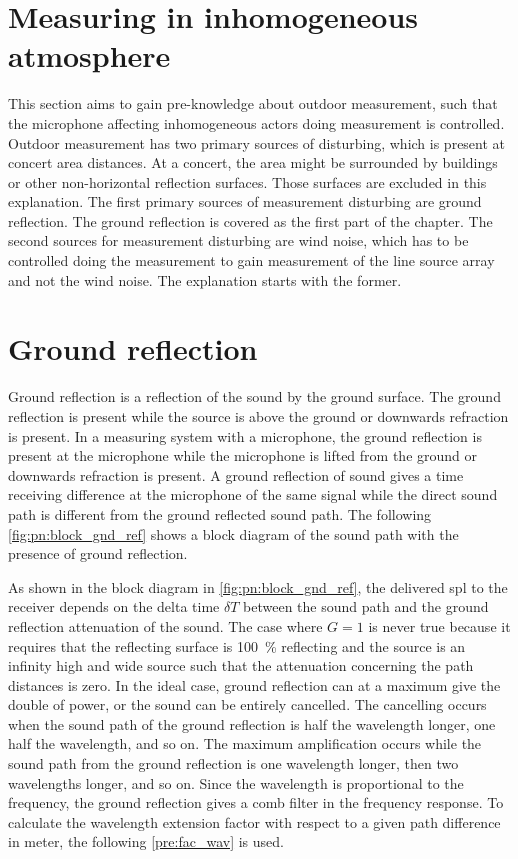 \section{Measuring in inhomogeneous atmosphere}
This section aims to gain pre-knowledge about outdoor measurement, such that the microphone affecting inhomogeneous actors doing measurement is controlled. Outdoor measurement has two primary sources of disturbing, which is present at concert area distances. At a concert, the area might be surrounded by buildings or other non-horizontal reflection surfaces. Those surfaces are excluded in this explanation. The first primary sources of measurement disturbing are ground reflection. The ground reflection is covered as the first part of the chapter. The second sources for measurement disturbing are wind noise, which has to be controlled doing the measurement to gain measurement of the line source array and not the wind noise. The explanation starts with the former.

\section{Ground reflection}\label{pre:ground_ref}
Ground reflection is a reflection of the sound by the ground surface. The ground reflection is present while the source is above the ground or downwards refraction is present. In a measuring system with a microphone, the ground reflection is present at the microphone while the microphone is lifted from the ground or downwards refraction is present. A ground reflection of sound gives a time receiving difference at the microphone of the same signal while the direct sound path is different from the ground reflected sound path. The following \autoref{fig:pn:block_gnd_ref} shows a block diagram of the sound path with the presence of ground reflection.



As shown in the block diagram in \autoref{fig:pn:block_gnd_ref}, the delivered \gls{spl} to the receiver depends on the delta time $\delta T$ between the sound path and the ground reflection attenuation of the sound. The case where $G=1$ is never true because it requires that the reflecting surface is \SI{100}{\percent} reflecting and the source is an infinity high and wide source such that the attenuation concerning the path distances is zero. In the ideal case, ground reflection can at a maximum give the double of power,  or the sound can be entirely cancelled. The cancelling occurs when the sound path of the ground reflection is half the wavelength longer, one half the wavelength, and so on. The maximum amplification occurs while the sound path from the ground reflection is one wavelength longer, then two wavelengths longer, and so on. Since the wavelength is proportional to the frequency, the ground reflection gives a comb filter in the frequency response. To calculate the wavelength extension factor with respect to a given path difference in meter, the following \autoref{pre:fac_wav} is used.

